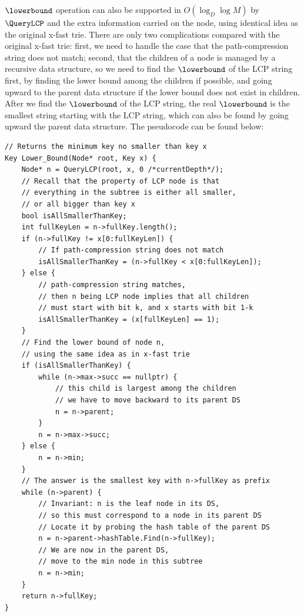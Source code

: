 \documentclass[11pt, usletter]{article}
\begin{document}
$\lowerbound$ operation can also be supported in $O(\log_D\log M)$ by $\QueryLCP$ and the extra information 
carried on the node, using identical idea as the original x-fast trie. 
There are only two complications compared with the original x-fast trie: 
first, we need to handle the case that the path-compression string does not match; 
second, that the children of a node is managed by a recursive data structure, 
so we need to find the $\lowerbound$ of the LCP string first, 
by finding the lower bound among the children if possible, 
and going upward to the parent data structure if the lower bound does not exist in children.
After we find the $\lowerbound$ of the LCP string, 
the real $\lowerbound$ is the smallest string starting with the LCP string, 
which can also be found by going upward the parent data structure.
The pseudocode can be found below:

\singlespacing\begin{codebox}
\begin{verbatim}
// Returns the minimum key no smaller than key x
Key Lower_Bound(Node* root, Key x) {
    Node* n = QueryLCP(root, x, 0 /*currentDepth*/);
    // Recall that the property of LCP node is that 
    // everything in the subtree is either all smaller, 
    // or all bigger than key x
    bool isAllSmallerThanKey;
    int fullKeyLen = n->fullKey.length();
    if (n->fullKey != x[0:fullKeyLen]) {
        // If path-compression string does not match
        isAllSmallerThanKey = (n->fullKey < x[0:fullKeyLen]);
    } else {
        // path-compression string matches, 
        // then n being LCP node implies that all children 
        // must start with bit k, and x starts with bit 1-k
        isAllSmallerThanKey = (x[fullKeyLen] == 1);
    }
    // Find the lower bound of node n, 
    // using the same idea as in x-fast trie
    if (isAllSmallerThanKey) {
        while (n->max->succ == nullptr) {
            // this child is largest among the children
            // we have to move backward to its parent DS
            n = n->parent;
        }
        n = n->max->succ;
    } else {
        n = n->min;
    }
    // The answer is the smallest key with n->fullKey as prefix
    while (n->parent) {
        // Invariant: n is the leaf node in its DS,
        // so this must correspond to a node in its parent DS
        // Locate it by probing the hash table of the parent DS
        n = n->parent->hashTable.Find(n->fullKey);
        // We are now in the parent DS, 
        // move to the min node in this subtree 
        n = n->min;
    }
    return n->fullKey;
}
\end{verbatim}
\end{codebox}\doublespacing
\end{document}
